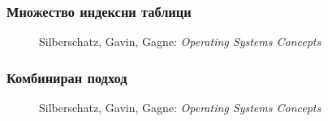 \documentclass[ignorenonframetext, hyperref=unicode]{beamer}
\begin{document}
\begin{frame}
\frametitle{Множество индексни таблици}
\begin{figure}[h]
\center
{}
\caption{Silberschatz, Gavin, Gagne: {\em Operating Systems Concepts}}
\end{figure}
\end{frame}


\begin{frame}
\frametitle{Комбиниран подход}
\begin{figure}[h]
\center
{}
\caption{Silberschatz, Gavin, Gagne: {\em Operating Systems Concepts}}
\end{figure}
\end{frame}
\end{document}
